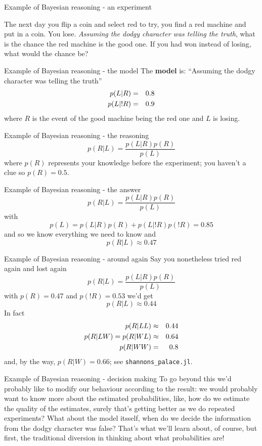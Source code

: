 \documentclass{beamer}
\newcommand{\cored}{\color{red}{}}
\newcommand{\cor}{\color{reddish}{}}
\newcommand{\cob}{\color{black}{}}
\begin{document}
\begin{frame}{Example of Bayesian reasoning - an experiment}
  
  The next day you flip a coin and select \cored{}red\cob{} to try, you find a \cored{}red\cob{} machine
  and put in a coin. You lose. \textsl{Assuming the dodgy character was
  telling the truth}, what is the chance the red machine is the good one. If you had won instead of losing, what would the
  chance be?
\end{frame}

\begin{frame}{Example of Bayesian reasoning - the model}
The \textbf{model} is: ``Assuming the dodgy character was
telling the truth''
\cor
\begin{eqnarray*}
  p(L|R)&=&0.8\cr
  p(L|!R)&=&0.9
\end{eqnarray*}
\cob{}where \cor{}$R$\cob{} is the event of the good machine being the \cored{}red\cob{} one and \cor{}$L$\cob{} is losing.
\end{frame}

\begin{frame}{Example of Bayesian reasoning - the reasoning}
  \cor
  $$p(R|L)=\frac{p(L|R)p(R)}{p(L)}$$ \cob
where \cor$p(R)$\cob{} represents your knowledge before the experiment; you haven't a clue so \cor$p(R)=0.5$\cob{}.
\end{frame}


\begin{frame}{Example of Bayesian reasoning - the answer}
  \cor
  $$p(R|L)=\frac{p(L|R)p(R)}{p(L)}$$ \cob
  with\cor{}
  $$p(L)=p(L|R)p(R)+p(L|!R)p(!R)=0.85$$\cob{}
  and so we know everything we need to know and\cor{}
  $$p(R|L)\approx 0.47$$
  \cob{}
\end{frame}


\begin{frame}{Example of Bayesian reasoning - around again}
Say you nonetheless tried \cored{}red\cob{} again and lost again
  \cor
  $$p(R|L)=\frac{p(L|R)p(R)}{p(L)}$$ \cob
  with \cor{}$p(R)=0.47$\cob{} and \cor{}$p(!R)=0.53$\cob{}
  we'd get\cor{}
  $$p(R|L)\approx 0.44$$
  \cob{}
  In fact \cor{}
  \begin{eqnarray*}
    p(R|LL)&\approx& 0.44\cr
    p(R|LW)=p(R|WL)&\approx& 0.64\cr
    p(R|WW)&=&0.8
  \end{eqnarray*}
  \cob{}and, by the way, \cor$p(R|W)=0.66$\cob{}; see \texttt{shannons\_palace.jl}.
\end{frame}

\begin{frame}{Example of Bayesian reasoning - decision making}
  To go beyond this we'd probably like to modify our behaviour
  according to the result: we would probably want to know more about
  the estimated probabilities, like, how do we estimate the quality of
  the estimates, surely that's getting better as we do repeated
  experiments? What about the model itsself, when do we decide the
  information from the \cor{}dodgy character\cob{} was false? That's
  what we'll learn about, of course, but first, the traditional
  diversion in thinking about what probabilities are!
  \end{frame}
\end{document}
